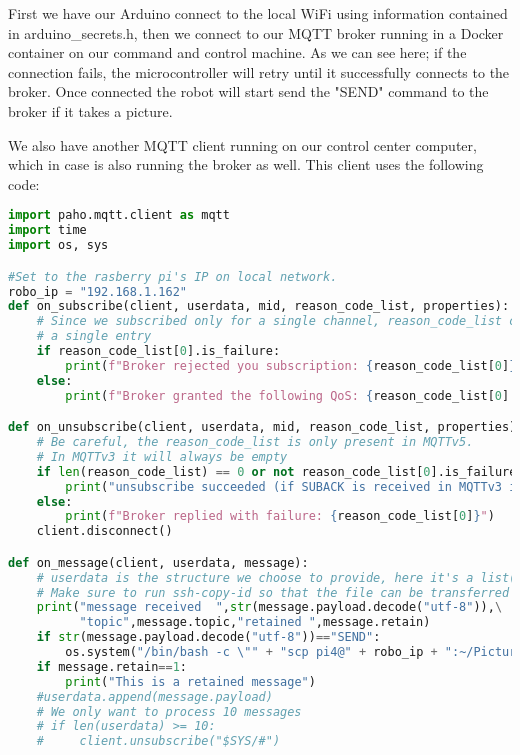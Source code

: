 \documentclass[12pt,a4paper]{article}
\begin{document}
\clearpage

\newpage

First we have our Arduino connect to the local WiFi using information contained in arduino_secrets.h, then we connect to our MQTT broker running in a Docker container on our command and control machine.
As we can see here; if the connection fails, the microcontroller will retry until it successfully connects to the broker. Once connected the robot will start send the "SEND" command to the broker if it takes a picture.

We also have another MQTT client running on our control center computer, which in case is also running the broker as well.
This client uses the following code:

\begin{lstlisting}[language=Python, caption=Command Unit Code]
import paho.mqtt.client as mqtt
import time
import os, sys

#Set to the rasberry pi's IP on local network.
robo_ip = "192.168.1.162"
def on_subscribe(client, userdata, mid, reason_code_list, properties):
    # Since we subscribed only for a single channel, reason_code_list contains
    # a single entry
    if reason_code_list[0].is_failure:
        print(f"Broker rejected you subscription: {reason_code_list[0]}")
    else:
        print(f"Broker granted the following QoS: {reason_code_list[0].value}")

def on_unsubscribe(client, userdata, mid, reason_code_list, properties):
    # Be careful, the reason_code_list is only present in MQTTv5.
    # In MQTTv3 it will always be empty
    if len(reason_code_list) == 0 or not reason_code_list[0].is_failure:
        print("unsubscribe succeeded (if SUBACK is received in MQTTv3 it success)")
    else:
        print(f"Broker replied with failure: {reason_code_list[0]}")
    client.disconnect()

def on_message(client, userdata, message):
    # userdata is the structure we choose to provide, here it's a list()
    # Make sure to run ssh-copy-id so that the file can be transferred without a password
    print("message received  ",str(message.payload.decode("utf-8")),\
          "topic",message.topic,"retained ",message.retain)
    if str(message.payload.decode("utf-8"))=="SEND":
        os.system("/bin/bash -c \"" + "scp pi4@" + robo_ip + ":~/Picture.jpg ./" + "\"")
    if message.retain==1:
        print("This is a retained message")
    #userdata.append(message.payload)
    # We only want to process 10 messages
    # if len(userdata) >= 10:
    #     client.unsubscribe("$SYS/#")


\end{lstlisting}
\end{document}
